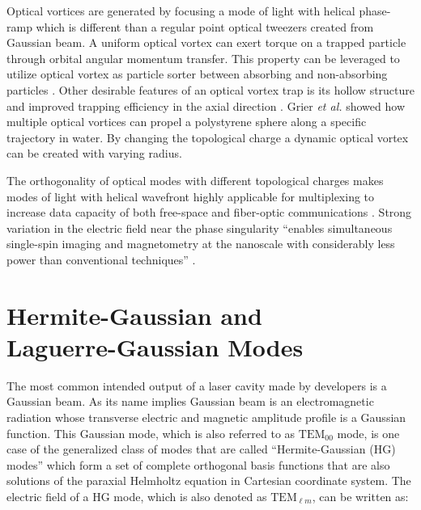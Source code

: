 Optical vortices are generated by focusing a mode of light with helical phase-ramp which is different than a regular point optical tweezers created from Gaussian beam. A uniform optical vortex can exert torque on a trapped particle through orbital angular momentum transfer. This property can be leveraged to utilize optical vortex as particle sorter between absorbing and non-absorbing particles \cite{ONEIL2000139, Parkin:06, chavez2003}. Other desirable features of an optical vortex trap is its hollow structure and improved trapping efficiency in the axial direction \cite{NIEMINEN2008195}. Grier \emph{et al.} \cite{Curtis:03}  showed how multiple optical vortices can propel a polystyrene sphere along a specific trajectory in water. By changing the topological charge a dynamic optical vortex can be created with varying radius. 

The orthogonality of optical modes with different topological charges makes modes of light with helical wavefront highly applicable for multiplexing to increase data capacity of both free-space and fiber-optic communications \cite{Gibson:04, Willner_2016, Bozinovic1545, SHAO2018545}. Strong variation in the electric field near the phase singularity ``enables simultaneous single-spin imaging and magnetometry at the nanoscale with considerably less power than conventional techniques'' \cite{maurer2010}.

\section{Hermite-Gaussian and \\ Laguerre-Gaussian Modes}

The most common intended output of a laser cavity made by developers is a Gaussian beam. As its name implies Gaussian beam is an electromagnetic radiation whose transverse electric and magnetic amplitude profile is a Gaussian function. This Gaussian mode, which is also referred to as $\mathrm{TEM}_{00}$ mode, is one case of the generalized class of modes that are called ``Hermite-Gaussian (HG) modes'' which form a set of complete orthogonal basis functions that are also solutions of the paraxial Helmholtz equation in Cartesian coordinate system. The electric field of a HG mode, which is also denoted as $\mathrm{TEM}_{\ell m}$, can be written as:

